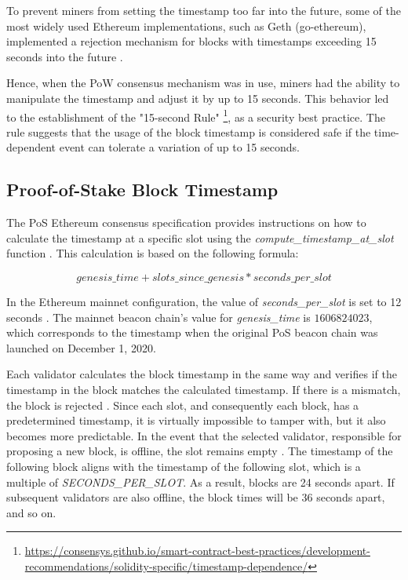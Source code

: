 To prevent miners from setting the timestamp too far into the future, some of the most widely used Ethereum implementations, such as Geth (go-ethereum), implemented a rejection mechanism for blocks with timestamps exceeding 15 seconds into the future \cite{go-ethereum-15-sek-limit}.

Hence, when the PoW consensus mechanism was in use, miners had the ability to
manipulate the timestamp and adjust it by up to 15 seconds. This behavior led
to the establishment of the "15-second Rule"
\footnote{\url{https://consensys.github.io/smart-contract-best-practices/development-recommendations/solidity-specific/timestamp-dependence/}},
as a security best practice. The
rule suggests that the usage of the block timestamp is considered
safe if the time-dependent event can tolerate a variation of up to 15 seconds. 

\subsection{Proof-of-Stake Block Timestamp}

The PoS Ethereum consensus specification provides instructions on how to
calculate the timestamp at a specific slot using the
\textit{compute\_timestamp\_at\_slot} function \cite{compute-timestamp-at-slot}.
This calculation is based on the following formula:

\begin{equation}
genesis\_time + slots\_since\_genesis *
seconds\_per\_slot
\end{equation}


In the Ethereum mainnet configuration, the value of \textit{seconds\_per\_slot} is set to
12 seconds \cite{seconds-per-slot-mainnet} \cite{seconds-per-slot-mainnet-doc}.
The mainnet beacon chain's value for \textit{genesis\_time} is $1606824023$, which
corresponds to the timestamp when the original PoS beacon chain was launched on
December 1, 2020.

Each validator calculates the block timestamp in the same way and verifies if
the timestamp in the block matches the calculated timestamp. If there is a
mismatch, the block is rejected \cite{process-execution-payload}. Since each
slot, and consequently each block, has a predetermined timestamp, it is
virtually impossible to tamper with, but it also becomes more predictable. In
the event that the selected validator, responsible for proposing a new block,
is offline, the slot remains empty \cite{validator-offline}. The timestamp of
the following block aligns with the timestamp of the following slot, which is a
multiple of \textit{SECONDS\_PER\_SLOT}. As a result, blocks are 24 seconds
apart. If subsequent validators are also offline, the block times will be 36
seconds apart, and so on.


